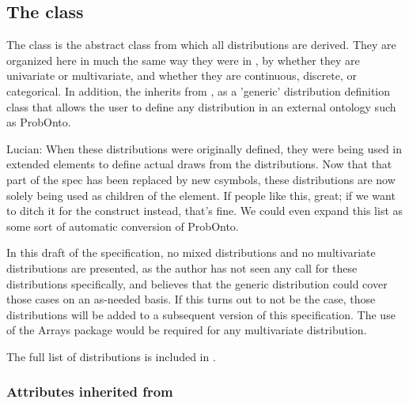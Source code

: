 \subsection{The  class}
\label{Distribution-class}
\label{distribution-class}

The \Distribution class is the abstract class from which all distributions are derived.  They are organized here in much the same way they were in \uncertml, by whether they are univariate or multivariate, and whether they are continuous, discrete, or categorical.  In addition, the \ExternalDistribution inherits from \Distribution, as a 'generic' distribution definition class that allows the user to define any distribution in an external ontology such as ProbOnto.


{\color{red} Lucian: \controversial When these distributions were originally defined, they were being used in extended \FunctionDefinition elements to define actual draws from the distributions.  Now that that part of the spec has been replaced by new csymbols, these distributions are now solely being used as children of the \Uncertainty element.  If people like this, great; if we want to ditch it for the \ExternalDistribution construct instead, that's fine.  We could even expand this list as some sort of automatic conversion of ProbOnto.}

In this draft of the \distrib specification, no mixed distributions and no multivariate distributions are presented, as the author has not seen any call for these distributions specifically, and believes that the generic \ExternalDistribution distribution could cover those cases on an as-needed basis.  If this turns out to not be the case, those distributions will be added to a subsequent version of this specification.  The use of the Arrays package would be required for any multivariate distribution.

The full list of distributions is included in .

\subsubsection{Attributes inherited from \SBase}


